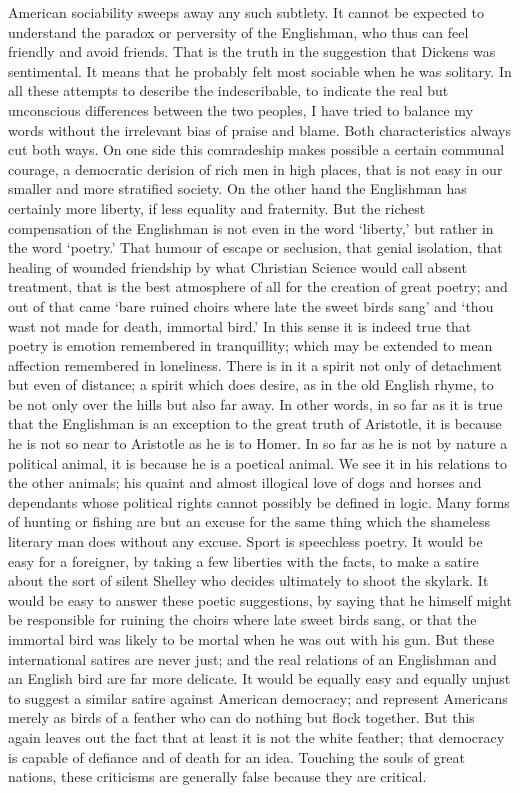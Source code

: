 \documentclass{book}
\begin{document}
American sociability sweeps away any such subtlety. It cannot be expected to understand the paradox or perversity of the Englishman, who thus can feel friendly and avoid friends. That is the truth in the suggestion that Dickens was sentimental. It means that he probably felt most sociable when he was solitary. In all these attempts to describe the indescribable, to indicate the real but unconscious differences between the two peoples, I have tried to balance my words without the irrelevant bias of praise and blame. Both characteristics always cut both ways. On one side this comradeship makes possible a certain communal courage, a democratic derision of rich men in high places, that is not easy in our smaller and more stratified society. On the other hand the Englishman has certainly more liberty, if less equality and fraternity. But the richest compensation of the Englishman is not even in the word ‘liberty,’ but rather in the word ‘poetry.’ That humour of escape or seclusion, that genial isolation, that healing of wounded friendship by what Christian Science would call absent treatment, that is the best atmosphere of all for the creation of great poetry; and out of that came ‘bare ruined choirs where late the sweet birds sang’ and ‘thou wast not made for death, immortal bird.’ In this sense it is indeed true that poetry is emotion remembered in tranquillity; which may be extended to mean affection remembered in loneliness. There is in it a spirit not only of detachment but even of distance; a spirit which does desire, as in the old English rhyme, to be not only over the hills but also far away. In other words, in so far as it is true that the Englishman is an exception to the great truth of Aristotle, it is because he is not so near to Aristotle as he is to Homer. In so far as he is not by nature a political animal, it is because he is a poetical animal. We see it in his relations to the other animals; his quaint and almost illogical love of dogs and horses and dependants whose political rights cannot possibly be defined in logic. Many forms of hunting or fishing are but an excuse for the same thing which the shameless literary man does without any excuse. Sport is speechless poetry. It would be easy for a foreigner, by taking a few liberties with the facts, to make a satire about the sort of silent Shelley who decides ultimately to shoot the skylark. It would be easy to answer these poetic suggestions, by saying that he himself might be responsible for ruining the choirs where late sweet birds sang, or that the immortal bird was likely to be mortal when he was out with his gun. But these international satires are never just; and the real relations of an Englishman and an English bird are far more delicate. It would be equally easy and equally unjust to suggest a similar satire against American democracy; and represent Americans merely as birds of a feather who can do nothing but flock together. But this again leaves out the fact that at least it is not the white feather; that democracy is capable of defiance and of death for an idea. Touching the souls of great nations, these criticisms are generally false because they are critical.
\end{document}
